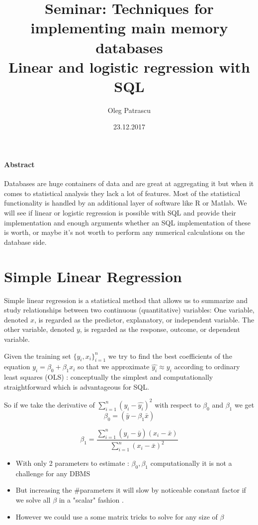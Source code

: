 \documentclass[12pt]{article}
\title{%
  Seminar: Techniques for
implementing main memory databases \\
  \large Linear and logistic regression with SQL}
\author{Oleg Patrascu}
\date{23.12.2017}
\begin{document}
\maketitle


\paragraph{Abstract}
\begin{center}
Databases are huge containers of data and are great at aggregating it but when it comes to statistical analysis they lack a lot of features.
Most of the statistical functionality is handled by an additional layer of software like R or Matlab. 
We will see if linear or logistic regression is possible with SQL and provide their implementation and enough arguments whether an SQL implementation of these is worth, or maybe
it's not worth to perform any numerical calculations on the database side.
\end{center}

\section{Simple Linear Regression}
Simple linear regression is a statistical method that
allows us to summarize and study relationships between
two continuous (quantitative) variables: 
One variable, denoted $x$, is regarded as the predictor,
explanatory, or independent variable. 
The other variable, denoted $y$, is regarded as
the response, outcome, or dependent variable.

Given the training set $\{y_i,x_i\}^n_{i=1}$ we try to find the best coefficients of the 
equation $y_i=\beta_0+\beta_1x_i$ so that we approximate $\hat{y_i} \approx y_i$ according  
to  ordinary least squares (OLS) : conceptually the simplest and
computationally straightforward which is advantageous for SQL. 


So if we take the derivative of $\sum_{i=1} ^n (y_i - \hat{y_i})^2$ with respect to $\beta_0$ and $\beta_1$
 we get $$\beta_0 = (\bar{y} - \beta_1\bar{x})$$
 
 $$\beta_1 =\frac{\sum_{i=1} ^n (y_i - \bar{y})(x_i - \bar{x})}{\sum_{i=1} ^n (x_i - \bar{x})^2}$$

\begin{itemize}

\item With only 2 parameters to estimate : $\beta_0,\beta_1$
computationally it is not a challenge for any DBMS

\item But increasing the #parameters it will slow by noticeable
constant factor if we solve all $\beta$ in a "scalar" fashion .
 
\item However we could use a some matrix tricks to solve for
any size of $\beta$ 

\end{itemize}
 
\end{document}

